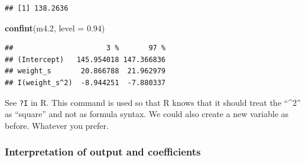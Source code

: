 \documentclass[
]{book}
\newenvironment{Shaded}{\begin{snugshade}}{\end{snugshade}}
\newcommand{\AttributeTok}[1]{\textcolor[rgb]{0.13,0.29,0.53}{#1}}
\newcommand{\FloatTok}[1]{\textcolor[rgb]{0.00,0.00,0.81}{#1}}
\newcommand{\FunctionTok}[1]{\textcolor[rgb]{0.13,0.29,0.53}{\textbf{#1}}}
\newcommand{\NormalTok}[1]{#1}
\newcommand{\SpecialCharTok}[1]{\textcolor[rgb]{0.81,0.36,0.00}{\textbf{#1}}}
\begin{document}
\begin{Shaded}
\end{Shaded}

\begin{verbatim}
## [1] 138.2636
\end{verbatim}

\begin{Shaded}
\begin{Highlighting}[]
\FunctionTok{confint}\NormalTok{(m4}\FloatTok{.2}\NormalTok{, }\AttributeTok{level =} \FloatTok{0.94}\NormalTok{)}
\end{Highlighting}
\end{Shaded}

\begin{verbatim}
##                      3 %       97 %
## (Intercept)   145.954018 147.366836
## weight_s       20.866788  21.962979
## I(weight_s^2)  -8.944251  -7.880337
\end{verbatim}

See \texttt{?I} in R. This command is used so that R knows that it should
treat the ``\^{}2'' as ``square'' and not as formula syntax.
We could also create a new variable as before. Whatever you prefer.

\subsubsection{Interpretation of output and coefficients}\label{interpretation-of-output-and-coefficients}
\end{document}
